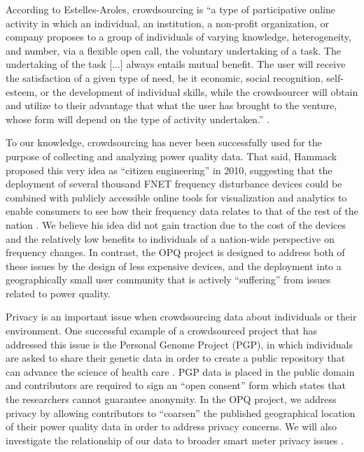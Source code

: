 According to Estelles-Aroles, crowdsourcing is ``a type of participative online activity in which an individual, an institution, a non-profit organization, or company proposes to a group of individuals of varying knowledge, heterogeneity, and number, via a flexible open call, the voluntary undertaking of a task. The undertaking of the task [...] always entails mutual benefit. The user will receive the satisfaction of a given type of need, be it economic, social recognition, self-esteem, or the development of individual skills, while the crowdsourcer will obtain and utilize to their advantage that what the user has brought to the venture, whose form will depend on the type of activity undertaken.'' \cite{Estelles-Aroles2012}.

To our knowledge, crowdsourcing has never been successfully used for the purpose of collecting and analyzing power quality data.  That said, Hammack proposed this very idea as ``citizen engineering'' in 2010, suggesting that the deployment of several thousand FNET frequency disturbance devices could be combined with publicly accessible online tools for visualization and analytics to enable consumers to see how their frequency data relates to that of the rest of the nation \cite{Hammack2010}.   We believe his idea did not gain traction due to the cost of the devices and the relatively low benefits to individuals of a nation-wide perspective on frequency changes.  In contrast, the OPQ project is designed to address both of these issues by the design of less expensive devices, and the deployment into a geographically small user community that is actively ``suffering'' from issues related to power quality.  

Privacy is an important issue when crowdsourcing data about individuals or their environment. One successful example of a crowdsourced project that has addressed this issue is the Personal Genome Project (PGP), in which individuals are asked to share their genetic data in order to create a public repository that can advance the science of health care \cite{Church2005}. PGP data is placed in the public domain and contributors are required to sign an ``open consent'' form which states that the researchers cannot guarantee anonymity. In the OPQ project, we address privacy by allowing contributors to ``coarsen'' the published geographical location of their power quality data in order to address privacy concerns.  We will also investigate the relationship of our data to broader smart meter privacy issues \cite{Balough2011}.

